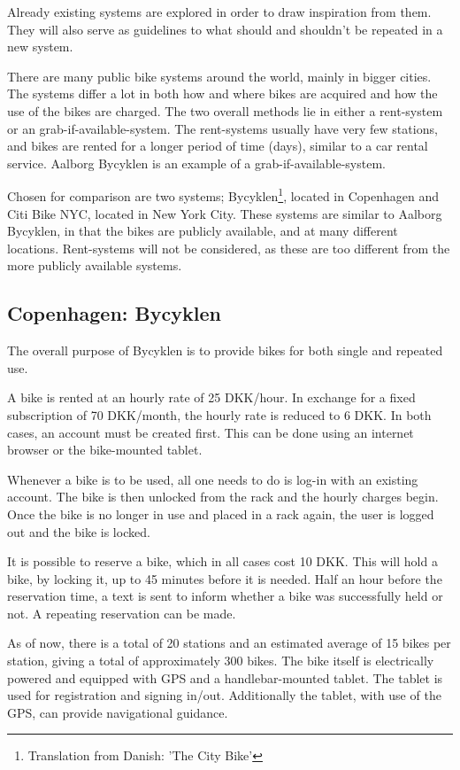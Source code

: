 Already existing systems are explored in order to draw inspiration from them.
They will also serve as guidelines to what should and shouldn't be repeated in a new system.

There are many public bike systems around the world, mainly in bigger cities.
The systems differ a lot in both how and where bikes are acquired and how the use of the bikes are charged.
The two overall methods lie in either a rent-system or an grab-if-available-system.
The rent-systems usually have very few stations, and bikes are rented for a longer period of time (days), similar to a car rental service.
Aalborg Bycyklen is an example of a grab-if-available-system.

Chosen for comparison are two systems; Bycyklen\footnote{Translation from Danish: 'The City Bike'}, located in Copenhagen and Citi Bike NYC, located in New York City.
These systems are similar to Aalborg Bycyklen, in that the bikes are publicly available, and at many different locations.
Rent-systems will not be considered, as these are too different from the more publicly available systems.

\subsection{Copenhagen: Bycyklen}
The overall purpose of Bycyklen\cite{cph_bycyklen} is to provide bikes for both single and repeated use.

A bike is rented at an hourly rate of 25 DKK/hour.
In exchange for a fixed subscription of 70 DKK/month, the hourly rate is reduced to 6 DKK.
In both cases, an account must be created first.
This can be done using an internet browser or the bike-mounted tablet.

Whenever a bike is to be used, all one needs to do is log-in with an existing account.
The bike is then unlocked from the rack and the hourly charges begin.
Once the bike is no longer in use and placed in a rack again, the user is logged out and the bike is locked.

It is possible to reserve a bike, which in all cases cost 10 DKK.
This will hold a bike, by locking it, up to 45 minutes before it is needed.
Half an hour before the reservation time, a text is sent to inform whether a bike was successfully held or not.
A repeating reservation can be made.

As of now, there is a total of 20 stations and an estimated average of 15 bikes per station, giving a total of approximately 300 bikes.
The bike itself is electrically powered and equipped with GPS and a handlebar-mounted tablet.
The tablet is used for registration and signing in/out.
Additionally the tablet, with use of the GPS, can provide navigational guidance.

